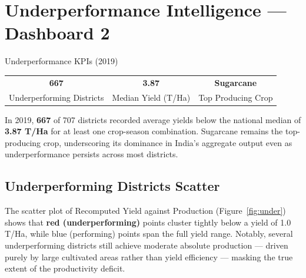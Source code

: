 \documentclass[10pt]{article}
\begin{document}
\section{Underperformance Intelligence — Dashboard 2}

\begin{kpibox}{Underperformance KPIs (2019)}
  \begin{center}
    \begin{tabular}{ccc}
      \large\textcolor{alertred}{\textbf{667}} &
      \large\textcolor{kpiblue}{\textbf{3.87}} &
      \large\textcolor{kpiblue}{\textbf{Sugarcane}} \\[2pt]
      \small Underperforming Districts & \small Median Yield (T/Ha) & \small Top Producing Crop
    \end{tabular}
  \end{center}
\end{kpibox}

\vspace{4pt}

In 2019, \textbf{667} of 707 districts recorded average yields below the national
median of \textbf{3.87 T/Ha} for at least one crop-season combination. Sugarcane
remains the top-producing crop, underscoring its dominance in India's aggregate
output even as underperformance persists across most districts.

\subsection{Underperforming Districts Scatter}
The scatter plot of Recomputed Yield against Production (Figure~\ref{fig:under})
shows that \textbf{red (underperforming)} points cluster tightly below a yield of
1.0 T/Ha, while blue (performing) points span the full yield range. Notably,
several underperforming districts still achieve moderate absolute production —
driven purely by large cultivated areas rather than yield efficiency — masking the
true extent of the productivity deficit.
\end{document}
